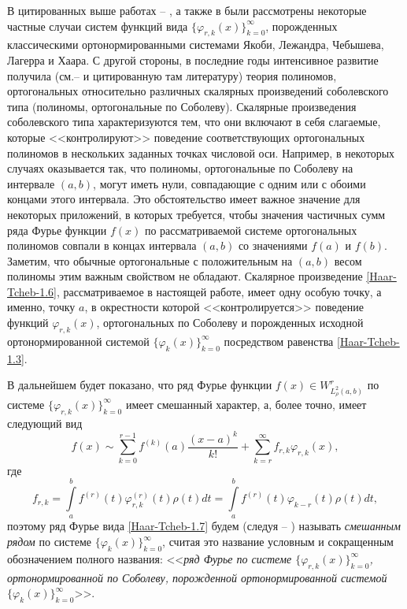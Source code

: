 В цитированных выше   работах  \cite{Haar-Tcheb-Shar11} -- \cite{Haar-Tcheb-Shar18}, а также в \cite{Haar-Tcheb-Shar19}   были рассмотрены некоторые частные случаи  систем функций вида $\{\varphi_{r,k}(x)\}_{k=0}^\infty$, порожденных классическими ортонормированными системами Якоби, Лежандра, Чебышева, Лагерра и Хаара. С другой стороны, в последние годы интенсивное развитие получила (см.\cite{Haar-Tcheb-IserKoch}--\cite{Haar-Tcheb-MarcelXu} и цитированную там литературу) теория полиномов, ортогональных относительно различных скалярных произведений соболевского типа (полиномы, ортогональные по Соболеву). Скалярные произведения соболевского типа характеризуются тем, что они включают в себя слагаемые, которые <<контролируют>> поведение соответствующих ортогональных полиномов  в нескольких заданных точках числовой оси. Например, в некоторых случаях оказывается так, что полиномы, ортогональные по Соболеву на интервале $(a,b)$, могут иметь нули, совпадающие с одним или с обоими концами этого интервала. Это обстоятельство имеет важное значение для некоторых приложений, в которых требуется, чтобы значения  частичных сумм ряда Фурье функции $f(x)$ по рассматриваемой системе ортогональных полиномов совпали в концах интервала $(a,b)$ со значениями $f(a)$ и $f(b)$.  Заметим, что обычные ортогональные с положительным на  $(a,b)$ весом полиномы этим важным свойством не обладают. Скалярное произведение \eqref{Haar-Tcheb-1.6}, рассматриваемое в настоящей работе, имеет одну особую точку, а именно, точку $a$, в окрестности которой <<контролируется>> поведение функций $\varphi_{r,k}(x)$, ортогональных по Соболеву и порожденных исходной ортонормированной системой $\{\varphi_{k}(x)\}_{k=0}^\infty$ посредством равенства \eqref{Haar-Tcheb-1.3}.



В дальнейшем будет показано,  что ряд Фурье функции $f(x)\in W^r_{L^2_\rho(a,b)}$ по системе  $\{\varphi_{r,k}(x)\}_{k=0}^\infty$ имеет смешанный характер, а, более точно, имеет следующий вид
  \begin{equation}\label{Haar-Tcheb-1.7}
f(x)\sim \sum_{k=0}^{r-1} f^{(k)}(a)\frac{(x-a)^k}{k!}+ \sum_{k=r}^\infty f_{r,k}\varphi_{r,k}(x),
\end{equation}
где
  \begin{equation}\label{Haar-Tcheb-1.8}
 f_{r,k}=\int\limits_a^b f^{(r)}(t) \varphi^{(r)}_{r,k}(t)\rho(t)dt=\int\limits_a^b f^{(r)}(t) \varphi_{k-r}(t)\rho(t)dt,
\end{equation}
поэтому ряд Фурье вида \eqref{Haar-Tcheb-1.7} будем (следуя \cite{Haar-Tcheb-Shar11} -- \cite{Haar-Tcheb-Shar18})  называть \textit{смешанным рядом} по  системе $\{\varphi_{k}(x)\}_{k=0}^\infty$, считая это название условным и сокращенным обозначением полного названия: <<\textit{ряд Фурье по системе  $\{\varphi_{r,k}(x)\}_{k=0}^\infty$, ортонормированной по Соболеву, порожденной ортонормированной системой $\{\varphi_{k}(x)\}_{k=0}^\infty$}>>.

